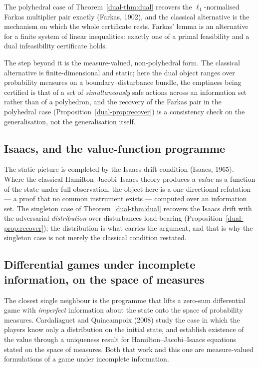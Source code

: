 \documentclass[10pt,twocolumn]{article}
\theoremstyle{plain}
\theoremstyle{definition}
\theoremstyle{remark}
\begin{document}
The polyhedral case of Theorem~\ref{dual-thm:dual} recovers the $\ell_{1}$-normalised Farkas
multiplier pair exactly (Farkas, 1902), and the classical alternative is the mechanism on
which the whole certificate rests. Farkas' lemma is an alternative for a finite system of
linear inequalities: exactly one of a primal feasibility and a dual infeasibility certificate
holds.

The step beyond it is the measure-valued, non-polyhedral form. The classical alternative is
finite-dimensional and static; here the dual object ranges over probability measures on a
boundary--disturbance bundle, the emptiness being certified is that of a set of
\emph{simultaneously} safe actions across an information set rather than of a polyhedron, and
the recovery of the Farkas pair in the polyhedral case
(Proposition~\ref{dual-prop:recover}) is a consistency check on the generalisation, not the
generalisation itself.

\subsection{Isaacs, and the value-function programme}

The static picture is completed by the Isaacs drift condition (Isaacs, 1965). Where the
classical Hamilton--Jacobi--Isaacs theory produces a \emph{value} as a function of the state
under full observation, the object here is a one-directional refutation --- a proof that no
common instrument exists --- computed over an information set. The singleton case of
Theorem~\ref{dual-thm:dual} recovers the Isaacs drift with the adversarial \emph{distribution}
over disturbances load-bearing (Proposition~\ref{dual-prop:recover}); the distribution is what
carries the argument, and that is why the singleton case is not merely the classical
condition restated.

\subsection{Differential games under incomplete information, on the space of measures}

The closest single neighbour is the programme that lifts a zero-sum differential game with
\emph{imperfect} information about the state onto the space of probability measures.
Cardaliaguet and Quincampoix (2008) study the case in which the players know only a
distribution on the initial state, and establish existence of the value through a uniqueness
result for Hamilton--Jacobi--Isaacs equations stated on the space of measures. Both that
work and this one are measure-valued formulations of a game under incomplete information.
\end{document}
